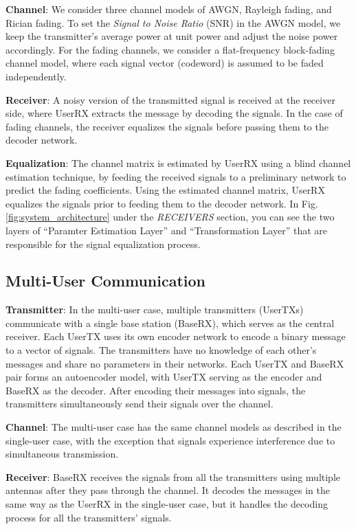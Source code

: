 \textbf{Channel}: We consider three channel models of AWGN, Rayleigh fading, and Rician fading. To set the \textit{Signal to Noise Ratio} (SNR) in the AWGN model, we keep the transmitter's average power at unit power and adjust the noise power accordingly. For the fading channels, we consider a flat-frequency block-fading channel model, where each signal vector (codeword) is assumed to be faded independently.

\textbf{Receiver}: A noisy version of the transmitted signal is received at the receiver side, where UserRX extracts the message by decoding the signals. In the case of fading channels, the receiver equalizes the signals before passing them to the decoder network.

\textbf{Equalization}: The channel matrix is estimated by UserRX using a blind channel estimation technique, by feeding the received signals to a preliminary network to predict the fading coefficients. Using the estimated channel matrix, UserRX equalizes the signals prior to feeding them to the decoder network. In Fig. \ref{fig:system_architecture} under the \textit{RECEIVERS} section, you can see the two layers of ``Paramter Estimation Layer'' and ``Transformation Layer'' that are responsible for the signal equalization process.

\subsection{Multi-User Communication}
\textbf{Transmitter}: In the multi-user case, multiple transmitters (UserTXs) communicate with a single base station (BaseRX), which serves as the central receiver. Each UserTX uses its own encoder network to encode a binary message to a vector of signals. The transmitters have no knowledge of each other's messages and share no parameters in their networks. Each UserTX and BaseRX pair forms an autoencoder model, with UserTX serving as the encoder and BaseRX as the decoder. After encoding their messages into signals, the transmitters simultaneously send their signals over the channel.

\textbf{Channel}: The multi-user case has the same channel models as described in the single-user case, with the exception that signals experience interference due to simultaneous transmission.

\textbf{Receiver}: BaseRX receives the signals from all the transmitters using multiple antennas after they pass through the channel. It decodes the messages in the same way as the UserRX in the single-user case, but it handles the decoding process for all the transmitters' signals.

